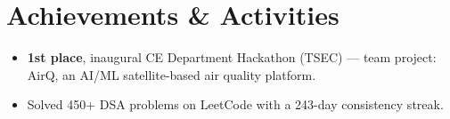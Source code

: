 \documentclass[10pt]{article}
\begin{document}
\section*{Achievements \& Activities}
\begin{itemize}[noitemsep]
    \item \textbf{1st place}, inaugural CE Department Hackathon (TSEC) --- team project: AirQ, an AI/ML satellite-based air quality platform.
    \item Solved 450+ DSA problems on LeetCode with a 243-day consistency streak.
\end{itemize}
\end{document}
